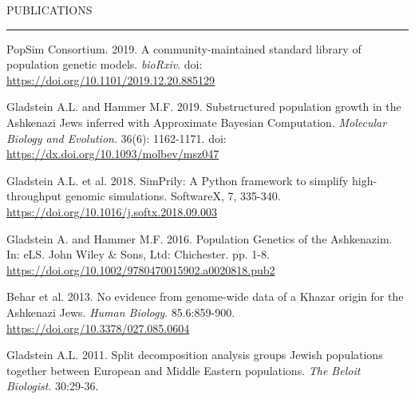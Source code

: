 \documentclass{resume} %
\renewenvironment{rSection}[1]{
\sectionskip
\textcolor{RoyalPurple}{\MakeUppercase{#1}}
\sectionlineskip
\hrule
\begin{list}{}{
\setlength{\leftmargin}{1.5em}
}
\item[]
}{
\end{list}
}
\begin{document}
\begin{rSection}{Publications}

\item PopSim Consortium. 2019. A community-maintained standard library of population genetic models. \textit{bioRxiv}. doi: \url{https://doi.org/10.1101/2019.12.20.885129}
\item Gladstein A.L. and Hammer M.F. 2019. Substructured population growth in the Ashkenazi Jews inferred with Approximate Bayesian Computation. \textit{Molecular Biology and Evolution}. 36(6): 1162-1171. doi: \url{https://dx.doi.org/10.1093/molbev/msz047}
\item Gladstein A.L. et al. 2018. SimPrily: A Python framework to simplify high-throughput genomic simulations. SoftwareX, 7, 335-340. \url{https://doi.org/10.1016/j.softx.2018.09.003}
\item Gladstein A. and Hammer M.F. 2016. Population Genetics of the Ashkenazim. In: eLS. John Wiley \& Sons, Ltd: Chichester. pp. 1-8. \url{https://doi.org/10.1002/9780470015902.a0020818.pub2}
\item Behar et al. 2013. No evidence from genome-wide data of a Khazar origin for the Ashkenazi Jews. \textit{Human Biology}. 85.6:859-900. \url{https://doi.org/10.3378/027.085.0604}
\item Gladstein A.L. 2011. Split decomposition analysis groups Jewish populations together between European and Middle Eastern populations. \textit{The Beloit Biologist}. 30:29-36.

\end{rSection}

\end{document}
